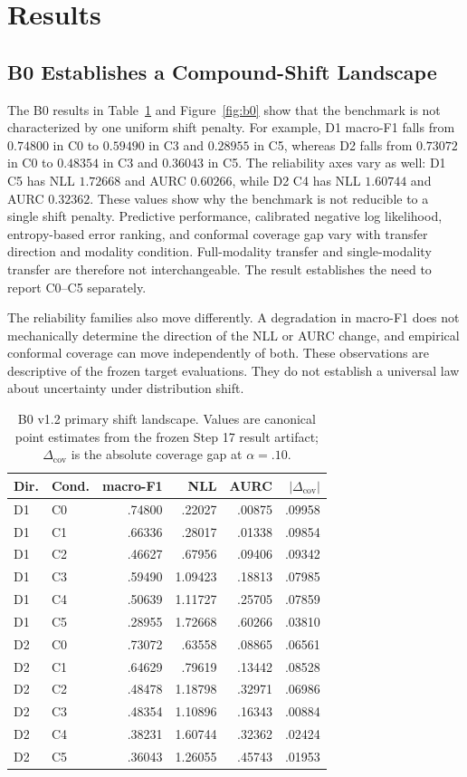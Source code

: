 \documentclass[10pt,twocolumn]{article}
\begin{document}
\section{Results}
\subsection{B0 Establishes a Compound-Shift Landscape}
The B0 results in Table~\ref{tab:b0} and Figure~\ref{fig:b0} show that the benchmark is not characterized by one uniform shift penalty. For example, D1 macro-F1 falls from $0.74800$ in C0 to $0.59490$ in C3 and $0.28955$ in C5, whereas D2 falls from $0.73072$ in C0 to $0.48354$ in C3 and $0.36043$ in C5. The reliability axes vary as well: D1 C5 has NLL $1.72668$ and AURC $0.60266$, while D2 C4 has NLL $1.60744$ and AURC $0.32362$. These values show why the benchmark is not reducible to a single shift penalty. Predictive performance, calibrated negative log likelihood, entropy-based error ranking, and conformal coverage gap vary with transfer direction and modality condition. Full-modality transfer and single-modality transfer are therefore not interchangeable. The result establishes the need to report C0--C5 separately.

The reliability families also move differently. A degradation in macro-F1 does not mechanically determine the direction of the NLL or AURC change, and empirical conformal coverage can move independently of both. These observations are descriptive of the frozen target evaluations. They do not establish a universal law about uncertainty under distribution shift.

\begin{table}[t]
\centering\scriptsize
\caption{B0 v1.2 primary shift landscape. Values are canonical point estimates from the frozen Step 17 result artifact; $\Delta_{\mathrm{cov}}$ is the absolute coverage gap at $\alpha=.10$.}
\label{tab:b0}
\begin{tabular}{llrrrr}
\toprule
Dir. & Cond. & macro-F1 & NLL & AURC & $|\Delta_{\mathrm{cov}}|$\\
\midrule
D1 & C0 & .74800 & .22027 & .00875 & .09958\\
D1 & C1 & .66336 & .28017 & .01338 & .09854\\
D1 & C2 & .46627 & .67956 & .09406 & .09342\\
D1 & C3 & .59490 & 1.09423 & .18813 & .07985\\
D1 & C4 & .50639 & 1.11727 & .25705 & .07859\\
D1 & C5 & .28955 & 1.72668 & .60266 & .03810\\
D2 & C0 & .73072 & .63558 & .08865 & .06561\\
D2 & C1 & .64629 & .79619 & .13442 & .08528\\
D2 & C2 & .48478 & 1.18798 & .32971 & .06986\\
D2 & C3 & .48354 & 1.10896 & .16343 & .00884\\
D2 & C4 & .38231 & 1.60744 & .32362 & .02424\\
D2 & C5 & .36043 & 1.26055 & .45743 & .01953\\
\bottomrule
\end{tabular}
\end{table}
\end{document}
